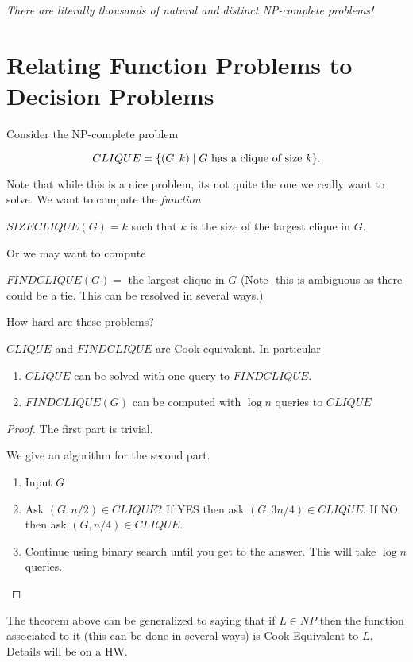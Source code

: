 \documentclass[12pt]{article}
\begin{document}
{\it There are literally thousands of natural and distinct NP-complete problems!}

\section{Relating Function Problems to Decision Problems}\label{se:decision}

Consider the NP-complete problem

$$CLIQUE = \{(G,k) \mid G \hbox{ has a clique of size $k$} \}.$$

Note that while this is a nice problem, its not quite the
one we really want to solve. We want to compute the {\it function}

$SIZECLIQUE(G) = k$ such that $k$ is the size of the largest clique in $G$.

Or we may want to compute

$FINDCLIQUE(G) = $ the largest clique in $G$
(Note- this is ambiguous as there could be a tie.
This can be resolved in several ways.)

How hard are these problems?

\begin{theorem}
$CLIQUE$ and $FINDCLIQUE$ are Cook-equivalent. In particular
\begin{enumerate}
\item
$CLIQUE$ can be solved with one query to $FINDCLIQUE$.
\item
$FINDCLIQUE(G)$ can be computed with $\log n$ queries to $CLIQUE$
\end{enumerate}
\end{theorem}

\begin{proof}

The first part is trivial.

We give an algorithm for the second part.

\begin{enumerate}
\item
Input $G$
\item
Ask $(G,n/2) \in CLIQUE$?
If YES then ask $(G,3n/4)\in CLIQUE$.
If NO then ask $(G,n/4)\in CLIQUE$.
\item
Continue using binary search until you get to the answer.
This will take $\log n$ queries.
\end{enumerate}

\end{proof}

The theorem above can be generalized to saying
that if $L\in NP$ then the function associated
to it (this can be done in several ways) is
Cook Equivalent to $L$. Details will be on a HW.
\end{document}

